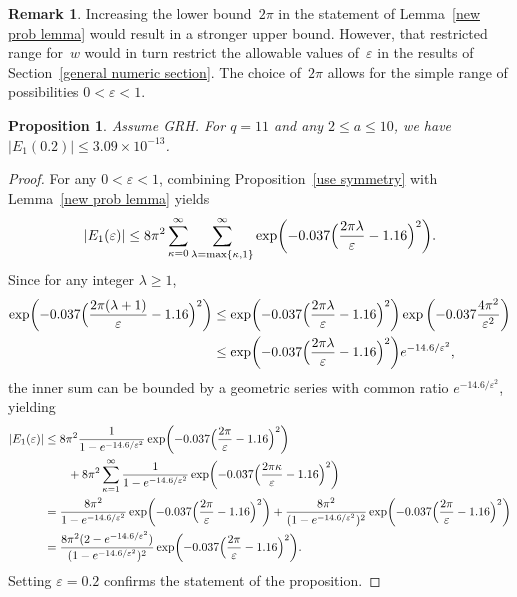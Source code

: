 \documentclass[11pt]{article}
\theoremstyle{plain}
\newtheorem{prop}[thm]{Proposition}
\theoremstyle{definition}
\newtheorem{rem}[thm]{Remark}
\numberwithin{equation}{section}
\newcommand{\0}{{\vec 0}}
\begin{document}
\begin{rem}
Increasing the lower bound~$2\pi$ in the statement of Lemma~\ref{new prob lemma} would result in a stronger upper bound. However, that restricted range for~$w$ would in turn restrict the allowable values of~$\varepsilon$ in the results of Section~\ref{general numeric section}. The choice of~$2\pi$ allows for the simple range of possibilities $0<\varepsilon<1$.
\end{rem}

\begin{prop} \label{bound E1}
Assume GRH. For $q=11$ and any $2\le a\le 10$, we have $|E_1(0.2)| \le 3.09\times10^{-13}$.
\end{prop}

\begin{proof}
For any $0<\varepsilon<1$, combining Proposition~\ref{use symmetry} with Lemma~\ref{new prob lemma} yields
\begin{align*}
|E_1(\varepsilon)|\le 8\pi^2\sum_{\kappa=0}^\infty \sum_{\lambda=\max\{\kappa,1\}}^\infty \exp\biggl( -0.037\Bigl( \frac{2\pi\lambda}{\varepsilon}-1.16 \Bigr)^2 \biggr).
\end{align*}
Since for any integer $\lambda\ge1$,
\begin{align*}
\exp\biggl( -0.037\Bigl( \frac{2\pi(\lambda+1)}{\varepsilon}-1.16 \Bigr)^2 \biggr) &\le \exp\biggl( -0.037\Bigl( \frac{2\pi\lambda}{\varepsilon}-1.16 \Bigr)^2 \biggr) \exp\left(-0.037\frac{4\pi^2}{\varepsilon^2}\right) \\
&\le \exp\biggl( -0.037\Bigl( \frac{2\pi\lambda}{\varepsilon}-1.16 \Bigr)^2 \biggr) e^{-14.6/\varepsilon^2},
\end{align*}
the inner sum can be bounded by a geometric series with common ratio $e^{-14.6/\varepsilon^2}$, yielding
\begin{align*}
|E_1(\varepsilon)|&\le 8\pi^2 \frac1{1-e^{-14.6/\varepsilon^2}} \exp\biggl( -0.037\Bigl( \frac{2\pi}{\varepsilon}-1.16 \Bigr)^2 \biggr) \\
&\qquad{}+ 8\pi^2 \sum_{\kappa=1}^\infty \frac1{1-e^{-14.6/\varepsilon^2}} \exp\biggl( -0.037\Bigl( \frac{2\pi\kappa}{\varepsilon}-1.16 \Bigr)^2 \biggr) \\
&= \frac{8\pi^2}{1-e^{-14.6/\varepsilon^2}} \exp\biggl( -0.037\Bigl( \frac{2\pi}{\varepsilon}-1.16 \Bigr)^2 \biggr) + \frac{8\pi^2}{(1-e^{-14.6/\varepsilon^2})^2} \exp\biggl( -0.037\Bigl( \frac{2\pi}{\varepsilon}-1.16 \Bigr)^2 \biggr) \\
&= \frac{8\pi^2(2-e^{-14.6/\varepsilon^2})}{(1-e^{-14.6/\varepsilon^2})^2} \exp\biggl( -0.037\Bigl( \frac{2\pi}{\varepsilon}-1.16 \Bigr)^2 \biggr).
\end{align*}
Setting $\varepsilon=0.2$ confirms the statement of the proposition.
\end{proof}
\end{document}
